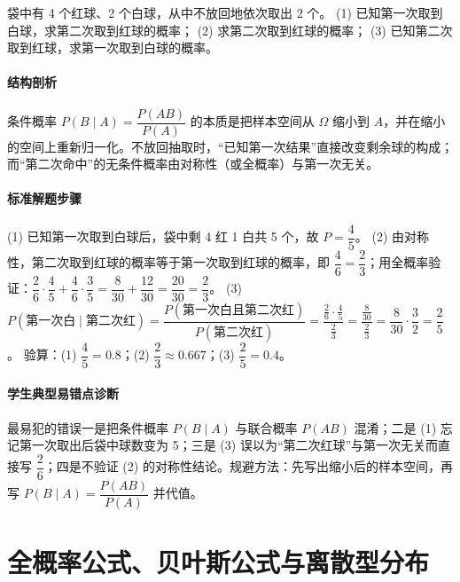 \begin{problem}
袋中有 4 个红球、2 个白球，从中不放回地依次取出 2 个。
(1) 已知第一次取到白球，求第二次取到红球的概率；
(2) 求第二次取到红球的概率；
(3) 已知第二次取到红球，求第一次取到白球的概率。
\end{problem}
\begin{solution}
\paragraph{结构剖析}
条件概率 $P(B\mid A)=\dfrac{P(AB)}{P(A)}$ 的本质是把样本空间从 $\Omega$ 缩小到 $A$，并在缩小的空间上重新归一化。不放回抽取时，“已知第一次结果”直接改变剩余球的构成；而“第二次命中”的无条件概率由对称性（或全概率）与第一次无关。
\paragraph{标准解题步骤}
(1) 已知第一次取到白球后，袋中剩 4 红 1 白共 5 个，故 $P=\dfrac45$。
(2) 由对称性，第二次取到红球的概率等于第一次取到红球的概率，即 $\dfrac{4}{6}=\dfrac23$；用全概率验证：$\dfrac{2}{6}\cdot\dfrac45+\dfrac{4}{6}\cdot\dfrac35=\dfrac{8}{30}+\dfrac{12}{30}=\dfrac{20}{30}=\dfrac23$。
(3) $P(\text{第一次白}\mid\text{第二次红})=\dfrac{P(\text{第一次白且第二次红})}{P(\text{第二次红})}=\dfrac{\frac26\cdot\frac45}{\frac23}=\dfrac{\frac{8}{30}}{\frac23}=\dfrac{8}{30}\cdot\dfrac32=\dfrac25$。
验算：(1) $\dfrac45=0.8$；(2) $\dfrac23\approx0.667$；(3) $\dfrac25=0.4$。
\paragraph{学生典型易错点诊断}
最易犯的错误一是把条件概率 $P(B\mid A)$ 与联合概率 $P(AB)$ 混淆；二是 (1) 忘记第一次取出后袋中球数变为 5；三是 (3) 误以为“第二次红球”与第一次无关而直接写 $\dfrac{2}{6}$；四是不验证 (2) 的对称性结论。规避方法：先写出缩小后的样本空间，再写 $P(B\mid A)=\dfrac{P(AB)}{P(A)}$ 并代值。
\end{solution}

\section{全概率公式、贝叶斯公式与离散型分布}

